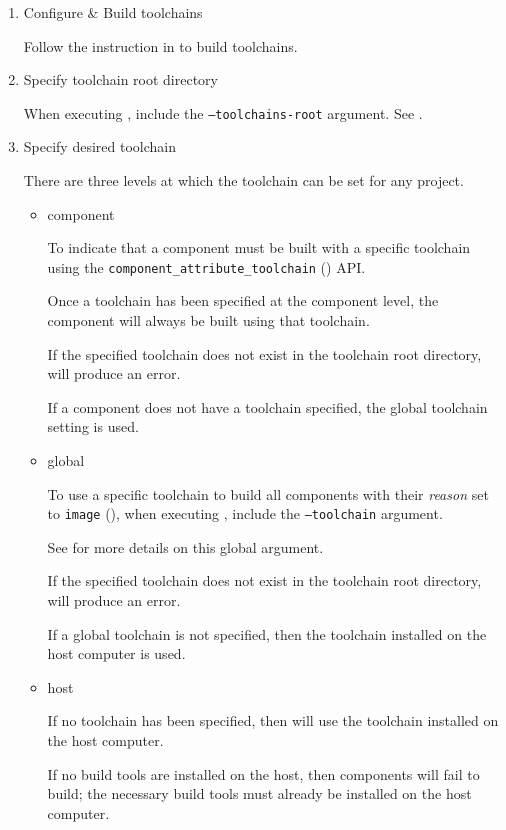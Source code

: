\begin{enumerate}
\item Configure \& Build toolchains

  Follow the instruction in  to
  build toolchains.

\item Specify toolchain root directory

  When executing \lmsbw, include the \texttt{--toolchains-root}
  argument.  See .

\item Specify desired toolchain

  There are three levels at which the toolchain can be set for any
  project.

  \begin{itemize}
  \item component

    To indicate that a component must be built with a specific
    toolchain using the \texttt{component\_attribute\_toolchain}
    () API.

    Once a toolchain has been specified at the component level, the
    component will always be built using that toolchain.

    If the specified toolchain does not exist in the toolchain root
    directory, \lmsbw will produce an error.

    If a component does not have a toolchain specified, the global
    toolchain setting is used.

  \item global

    To use a specific toolchain to build all components with their
    \emph{reason} set to \texttt{image} (),
    when executing \lmsbw, include the \texttt{--toolchain} argument.

    See  for more details on this global
    argument.

    If the specified toolchain does not exist in the toolchain root
    directory, \lmsbw will produce an error.

    If a global toolchain is not specified, then the toolchain
    installed on the host computer is used.

  \item host

    If no toolchain has been specified, then \lmsbw will use the
    toolchain installed on the host computer.

    If no build tools are installed on the host, then components will
    fail to build; the necessary build tools must already be installed
    on the host computer.

  \end{itemize}

\end{enumerate}


